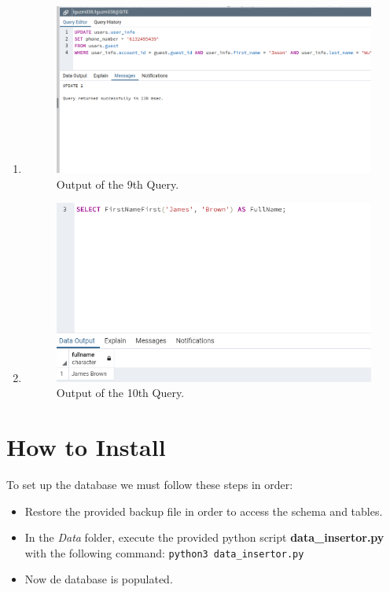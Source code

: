 \documentclass[12pt, lettersize]{article}
\theoremstyle{Remark}
\begin{document}
\begin{enumerate}
		\item 
		
		
		\begin{figure}[h]
			\centering
			\includegraphics[width= 0.6\linewidth]{Query9Output.png}
			\caption{Output of the 9th Query.}
		\end{figure}
		
		\item 
		
		
		\begin{figure}[h]
			\centering
			\includegraphics[width= 0.6\linewidth]{Query10Output.png}
			\caption{Output of the 10th Query.}
		\end{figure}
		
	\end{enumerate}
	

	
		
	\section{How to Install}
	
	To set up the database we must follow these steps in order:
	
	\begin{itemize}
		\item Restore the provided backup file in order to access the schema and tables.
		
		\item In the \textsl{Data} folder, execute the provided python script \textbf{data\_insertor.py} with the following command: \texttt{python3 data\_insertor.py} 
		
		\item Now de database is populated.
		
	\end{itemize}	
	
\end{document}
